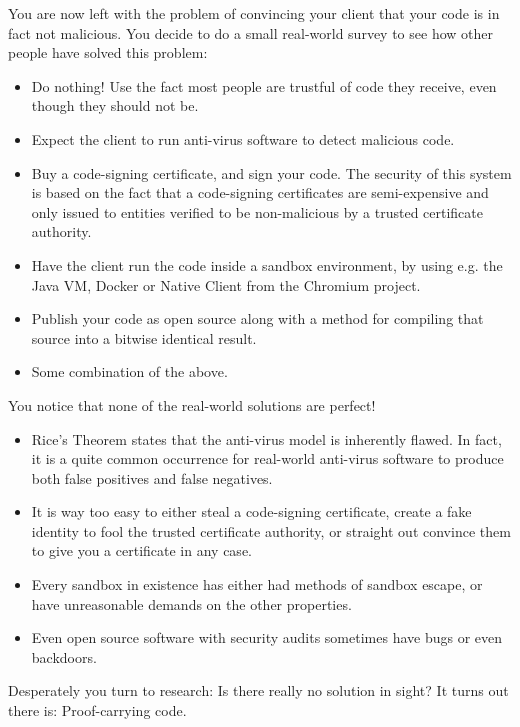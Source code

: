 You are now left with the problem of convincing your client that your code is in
fact not malicious. You decide to do a small real-world survey to see how other
people have solved this problem:

\begin{itemize}
\item Do nothing! Use the fact most people are trustful of code they receive,
  even though they should not be.
\item Expect the client to run anti-virus software to detect malicious code.
\item Buy a code-signing certificate, and sign your code. The security of this
  system is based on the fact that a code-signing certificates are
  semi-expensive and only issued to entities verified to be non-malicious by a
  trusted certificate authority.
\item Have the client run the code inside a sandbox environment, by using
  e.g. the Java VM, Docker or Native Client from the Chromium project.
\item Publish your code as open source along with a method for compiling that
  source into a bitwise identical result.
\item Some combination of the above.
\end{itemize}

You notice that none of the real-world solutions are perfect!

\begin{itemize}
\item Rice's Theorem states that the anti-virus model is inherently flawed. In
  fact, it is a quite common occurrence for real-world anti-virus software to
  produce both false positives and false negatives.
\item It is way too easy to either steal a code-signing certificate, create a
  fake identity to fool the trusted certificate authority, or straight out
  convince them to give you a certificate in any case.
\item Every sandbox in existence has either had methods of sandbox escape, or
  have unreasonable demands on the other properties.
\item Even open source software with security audits sometimes have bugs or even
  backdoors.
\end{itemize}


Desperately you turn to research: Is there really no solution in sight? It turns
out there is: Proof-carrying code.
